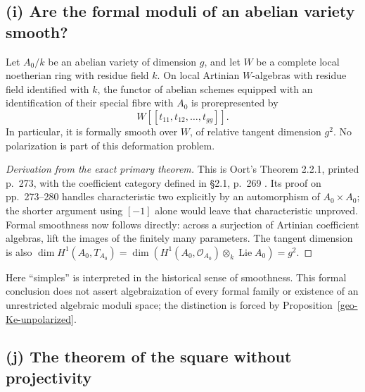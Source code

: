 \subsection{(i) Are the formal moduli of an abelian variety smooth?}

\begin{theorem}
\label{geo-Ki}
Let $A_0/k$ be an abelian variety of dimension $g$, and let $W$ be a
complete local noetherian ring with residue field $k$. On local Artinian
$W$-algebras with residue field identified with $k$, the functor of abelian
schemes equipped with an identification of their special fibre with $A_0$
is prorepresented by
\[
 W[[t_{11},t_{12},\ldots,t_{gg}]].
\]
In particular, it is formally smooth over $W$, of relative tangent
dimension $g^2$. No polarization is part of this deformation problem.
\end{theorem}
\begin{proof}[Derivation from the exact primary theorem]
This is Oort's Theorem 2.2.1, printed p.~273, with the coefficient category
defined in \S2.1, p.~269 \cite{Oort1971}. Its proof on pp.~273--280
handles characteristic two explicitly by an automorphism of $A_0\times A_0$;
the shorter argument using $[-1]$ alone would leave that characteristic
unproved. Formal smoothness now follows directly: across a surjection of
Artinian coefficient algebras, lift the images of the finitely many
parameters. The tangent dimension is also
$\dim H^1(A_0,T_{A_0})=\dim(H^1(A_0,\mathcal O_{A_0})
\otimes_k\operatorname{Lie}A_0)=g^2$.
\end{proof}

Here ``simples'' is interpreted in the historical sense of smoothness.
This formal conclusion does not assert algebraization of every formal
family or existence of an unrestricted algebraic moduli space; the
distinction is forced by Proposition~\ref{geo-Ke-unpolarized}.

\subsection{(j) The theorem of the square without projectivity}

